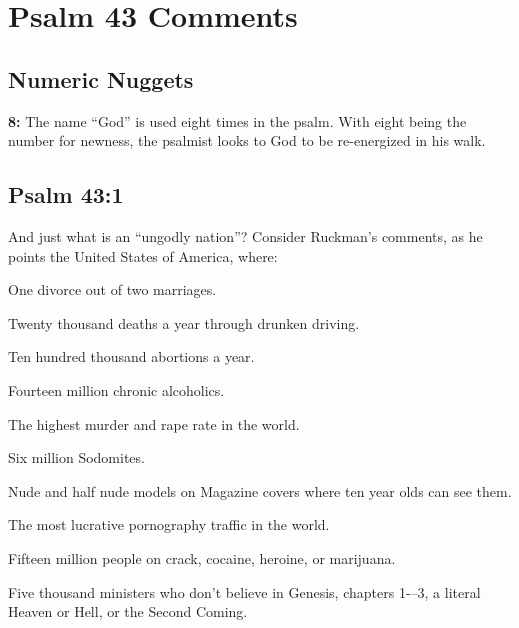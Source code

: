 \section{Psalm 43 Comments}

\subsection{Numeric Nuggets}
\textbf{8: } The name ``God'' is used eight times in the psalm. With eight being the number for newness, the psalmist looks to God to be re-energized in his walk.

\subsection{Psalm 43:1}
And just what is an ``ungodly nation''? Consider Ruckman's comments, as he points the United States of America, where:\begin{compactenum}
\item One divorce out of two marriages.
\item Twenty thousand deaths a year through drunken driving.
\item Ten hundred thousand abortions a year.
\item Fourteen million chronic alcoholics.
\item The highest murder and rape rate in the world.
\item Six million Sodomites.
\item Nude and half nude models on Magazine covers where ten year olds can see them.
\item The most lucrative pornography traffic in the world.
\item Fifteen million people on crack, cocaine, heroine, or marijuana.
\item Five thousand ministers who don't believe in Genesis, chapters 1-–3, a literal Heaven or Hell, or the Second Coming. 
\end{compactenum} 
